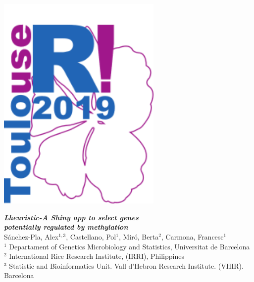 
\colorbox{qmuldarkblue}{
 \color{white}
 
\begin{minipage}{0.2\textwidth}
\begin{center}
 \vskip 1cm
	
  \includegraphics[width=8cm]{images/useRToulouse.png}

     \end{center}
     
\end{minipage}


\begin{minipage}{0.6\textwidth}
\vspace*{0.4cm}
\begin{center}
   \textrm
   {
    {\huge \bf \em Lheuristic-A Shiny app to select genes \\ potentially regulated by methylation}\\[1ex]
    {\large Sánchez-Pla, Alex$^{1,3}$, Castellano, Pol$^1$,  Mir\'{o}, Berta$^2$, Carmona, Francesc$^1$}\\[1ex]
    {\large $^1$ Departament of Genetics Microbiology and Statistics, Universitat de Barcelona\\
    $^2$ International Rice Research Institute, (IRRI), Philippines\\
    $^3$ Statistic and Bioinformatics Unit. Vall d'Hebron Research Institute.  (VHIR). Barcelona}
   }
   \end{center}
   

\end{minipage}}
